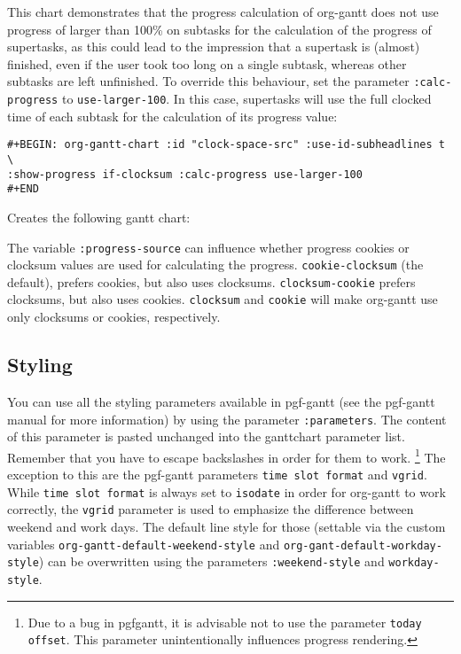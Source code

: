 \documentclass[11pt]{article}
\begin{document}
This chart demonstrates that the progress calculation of org-gantt does not use progress of larger than 100\% on subtasks for the calculation of the progress of supertasks, as this could lead to the impression that a supertask is (almost) finished, even if the user took too long on a single subtask, whereas other subtasks are left unfinished. To override this behaviour, set the parameter \texttt{:calc-progress} to \texttt{use-larger-100}. In this case, supertasks will use the full clocked time of each subtask for the calculation of its progress value:

\begin{verbatim}
#+BEGIN: org-gantt-chart :id "clock-space-src" :use-id-subheadlines t \
:show-progress if-clocksum :calc-progress use-larger-100 
#+END
\end{verbatim}

Creates the following gantt chart:



The variable \texttt{:progress-source} can influence whether progress cookies or clocksum values are used for calculating the progress. \texttt{cookie-clocksum} (the default), prefers cookies, but also uses clocksums. \texttt{clocksum-cookie} prefers clocksums, but also uses cookies. \texttt{clocksum} and \texttt{cookie} will make org-gantt use only clocksums or cookies, respectively.

\subsection{Styling}
\label{sec:org9278df7}

You can use all the styling parameters available in pgf-gantt (see the pgf-gantt manual for more information) by using the parameter \texttt{:parameters}. The content of this parameter is pasted unchanged into the ganttchart parameter list. Remember that you have to escape backslashes in order for them to work. \footnote{Due to a bug in pgfgantt, it is advisable not to use the parameter \texttt{today offset}. This parameter unintentionally influences progress rendering.}
The exception to this are the pgf-gantt parameters \texttt{time slot format} and \texttt{vgrid}. While \texttt{time slot format} is always set to \texttt{isodate} in order for org-gantt to work correctly, the \texttt{vgrid} parameter is used to emphasize the difference between weekend and work days. The default line style for those (settable via the custom variables \texttt{org-gantt-default-weekend-style} and \texttt{org-gant-default-workday-style}) can be overwritten using the parameters \texttt{:weekend-style} and \texttt{workday-style}. 
\end{document}
